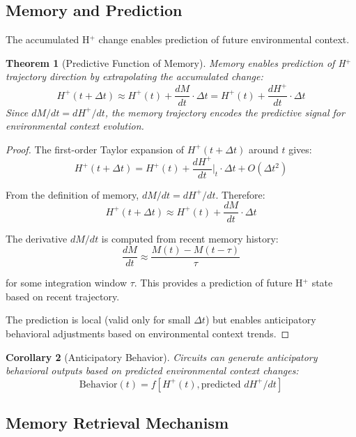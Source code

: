 \documentclass[aps,prd,twocolumn,superscriptaddress,floatfix,nofootinbib]{revtex4-2}
\newtheorem{theorem}{Theorem}[section]
\newtheorem{corollary}[theorem]{Corollary}
\theoremstyle{remark}
\begin{document}
\subsection{Memory and Prediction}

The accumulated H$^+$ change enables prediction of future environmental context.

\begin{theorem}[Predictive Function of Memory]
\label{thm:memory_prediction}
Memory enables prediction of H$^+$ trajectory direction by extrapolating the accumulated change:
\begin{equation}
H^+(t + \Delta t) \approx H^+(t) + \frac{dM}{dt} \cdot \Delta t = H^+(t) + \frac{dH^+}{dt} \cdot \Delta t
\end{equation}
Since $dM/dt = dH^+/dt$, the memory trajectory encodes the predictive signal for environmental context evolution.
\end{theorem}

\begin{proof}
The first-order Taylor expansion of $H^+(t + \Delta t)$ around $t$ gives:
$$
H^+(t + \Delta t) = H^+(t) + \frac{dH^+}{dt} \bigg|_t \cdot \Delta t + O(\Delta t^2)
$$

From the definition of memory, $dM/dt = dH^+/dt$. Therefore:
$$
H^+(t + \Delta t) \approx H^+(t) + \frac{dM}{dt} \cdot \Delta t
$$

The derivative $dM/dt$ is computed from recent memory history:
$$
\frac{dM}{dt} \approx \frac{M(t) - M(t - \tau)}{\tau}
$$

for some integration window $\tau$. This provides a prediction of future H$^+$ state based on recent trajectory.

The prediction is local (valid only for small $\Delta t$) but enables anticipatory behavioral adjustments based on environmental context trends.
\end{proof}

\begin{corollary}[Anticipatory Behavior]
\label{cor:anticipatory}
Circuits can generate anticipatory behavioral outputs based on predicted environmental context changes:
\begin{equation}
\text{Behavior}(t) = f[H^+(t), \text{predicted } dH^+/dt]
\end{equation}
\end{corollary}

\subsection{Memory Retrieval Mechanism}
\end{document}
